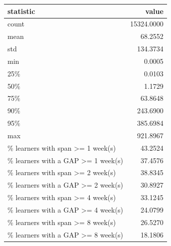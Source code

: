 \begin{tabular}{lr}
\toprule
statistic & value \\
\midrule
count & 15324.0000 \\
mean & 68.2552 \\
std & 134.3734 \\
min & 0.0005 \\
25\% & 0.0103 \\
50\% & 1.1729 \\
75\% & 63.8648 \\
90\% & 243.6900 \\
95\% & 385.6984 \\
max & 921.8967 \\
\% learners with span >= 1 week(s) & 43.2524 \\
\% learners with a GAP >= 1 week(s) & 37.4576 \\
\% learners with span >= 2 week(s) & 38.8345 \\
\% learners with a GAP >= 2 week(s) & 30.8927 \\
\% learners with span >= 4 week(s) & 33.1245 \\
\% learners with a GAP >= 4 week(s) & 24.0799 \\
\% learners with span >= 8 week(s) & 26.5270 \\
\% learners with a GAP >= 8 week(s) & 18.1806 \\
\bottomrule
\end{tabular}
